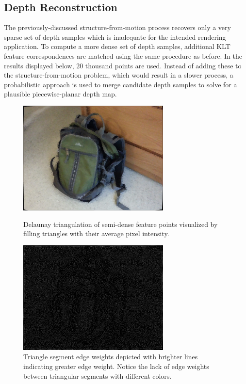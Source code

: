 \documentclass[conference]{acmsiggraph}
\begin{document}
\subsection{Depth Reconstruction}


The previously-discussed structure-from-motion process recovers
only a very sparse set of depth samples which is inadequate
for the intended rendering application.
To compute a more dense set of depth samples, additional KLT feature
correspondences are matched using the same procedure as before.
In the results displayed below, 20 thousand points are used.
Instead of adding these to the structure-from-motion problem,
which would result in a slower process, a probabilistic
approach is used to merge candidate depth samples
to solve for a plausible piecewise-planar depth map.

\begin{figure}[ht]
  \centering
  \includegraphics[width=3in]{images/delaunay}
  \caption{Delaunay triangulation of semi-dense feature points visualized
      by filling triangles with their average pixel intensity.}
  \label{fig:delaunay}
  \includegraphics[width=3in]{images/delaunay_edges}
  \caption{Triangle segment edge weights depicted with brighter lines
  indicating greater edge weight.  Notice the lack of edge weights
  between triangular segments with different colors.}
  \label{fig:delaunay_edges}
\end{figure}
\end{document}
